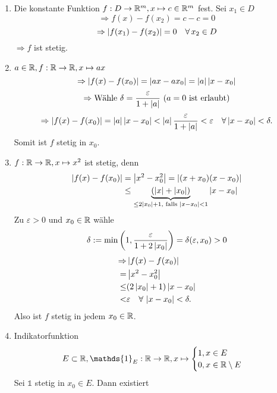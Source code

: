 \documentclass[../ana1.tex]{subfiles}
\begin{document}
\begin{bspe}\leavevmode
    \begin{enumerate}
        \item Die konstante Funktion \( f: D\rightarrow \mathbb{R}^m, 
        x\mapsto c\in\mathbb{R}^m \) fest.
        Sei \( x_1\in D \)
        \[ \Rightarrow f(x) - f(x_2) = c - c = 0 \]
        \[ \Rightarrow \left|f(x_1) - f(x_2)\right| = 0 \quad \forall \, 
        x_2\in D \]
        \(\Rightarrow f\) ist stetig.
        \item \( a\in\mathbb{R}, f:\mathbb{R} \rightarrow \mathbb{R}, x\mapsto ax \)
        \[ \Rightarrow \left| f(x) - f(x_0) \right| = 
        \left| ax - ax_0 \right| = \left|a\right|\left|x-x_0\right| \]
        \[ \Rightarrow \text{Wähle }\delta = 
        \frac{\varepsilon}{1+\left|a\right|} 
        \ (a=0 \text{ ist erlaubt}) \]
        \[ \Rightarrow \left|f(x) - f(x_0)\right| = \left|a\right|
        \left|x-x_0\right| < \left|a\right| \frac{\varepsilon}{1+\left|a\right|}
        < \varepsilon \quad \forall \left|x-x_0\right| < \delta. \]
        Somit ist \(f\) stetig in \(x_0\).
        \item \( f:\mathbb{R}\rightarrow\mathbb{R}, x\mapsto x^2 \)
        ist stetig, denn
        \begin{align*}
            \left| f(x) - f(x_0) \right| &= \left|x^2 - x_0^2\right| 
        = \left| (x+x_0)(x-x_0) \right|\\
            &\leq \underbrace{( \left|x\right| + \left|x_0\right| )}_{
                \leq 2\left|x_0\right|+1, \text{ falls } \left|x-x_0\right| < 1
            } \left|x-x_0\right|
        \end{align*}
        Zu \( \varepsilon > 0 \) und \( x_0 \in\mathbb{R} \) wähle
        \[ \delta := \min \left(1, \frac{\varepsilon}{1 + 2\left|x_0\right|} \right)
        = \delta(\varepsilon, x_0) > 0 \]
        \begin{align*}
            \Rightarrow &\left| f(x) - f(x_0) \right|\\
            = &\left|x^2 - x_0^2\right|\\
            \leq &(2\left|x_0\right| + 1) \left|x-x_0\right|\\
            < &\varepsilon \quad \forall \, \left|x-x_0\right| < \delta.
        \end{align*}
        Also ist \(f\) stetig in jedem \( x_0\in\mathbb{R} \).
        \item Indikatorfunktion 
        \[ E\subset \R, 
        \mathds{1}_E : \R\rightarrow\R, x\mapsto 
        \begin{cases}
            1, x\in E\\
            0, x\in\R \setminus E
        \end{cases} \]
        Sei \( \mathds{1} \) stetig in \( x_0\in E \). Dann existiert

\end{enumerate}
\end{bspe}
\end{document}
